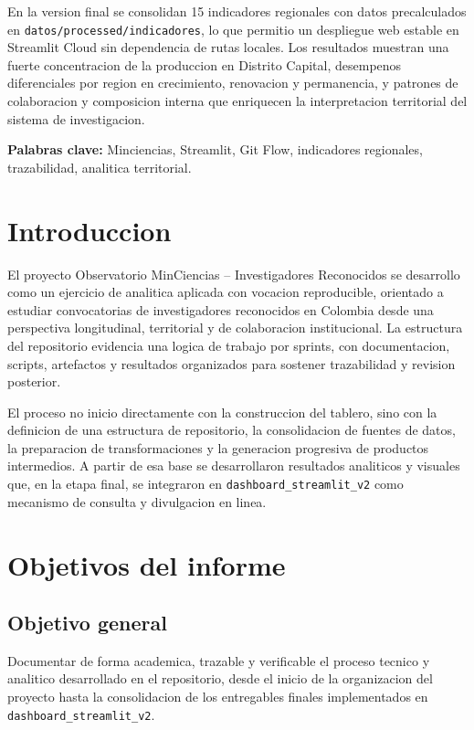 \documentclass[12pt,letterpaper]{article}
\begin{document}
En la version final se consolidan 15 indicadores regionales con datos precalculados en \texttt{datos/processed/indicadores}, lo que permitio un despliegue web estable en Streamlit Cloud sin dependencia de rutas locales. Los resultados muestran una fuerte concentracion de la produccion en Distrito Capital, desempenos diferenciales por region en crecimiento, renovacion y permanencia, y patrones de colaboracion y composicion interna que enriquecen la interpretacion territorial del sistema de investigacion.

\textbf{Palabras clave:} Minciencias, Streamlit, Git Flow, indicadores regionales, trazabilidad, analitica territorial.

\section{Introduccion}

El proyecto Observatorio MinCiencias -- Investigadores Reconocidos se desarrollo como un ejercicio de analitica aplicada con vocacion reproducible, orientado a estudiar convocatorias de investigadores reconocidos en Colombia desde una perspectiva longitudinal, territorial y de colaboracion institucional. La estructura del repositorio evidencia una logica de trabajo por sprints, con documentacion, scripts, artefactos y resultados organizados para sostener trazabilidad y revision posterior.

El proceso no inicio directamente con la construccion del tablero, sino con la definicion de una estructura de repositorio, la consolidacion de fuentes de datos, la preparacion de transformaciones y la generacion progresiva de productos intermedios. A partir de esa base se desarrollaron resultados analiticos y visuales que, en la etapa final, se integraron en \texttt{dashboard\_streamlit\_v2} como mecanismo de consulta y divulgacion en linea.

\section{Objetivos del informe}

\subsection{Objetivo general}

Documentar de forma academica, trazable y verificable el proceso tecnico y analitico desarrollado en el repositorio, desde el inicio de la organizacion del proyecto hasta la consolidacion de los entregables finales implementados en \texttt{dashboard\_streamlit\_v2}.
\end{document}
